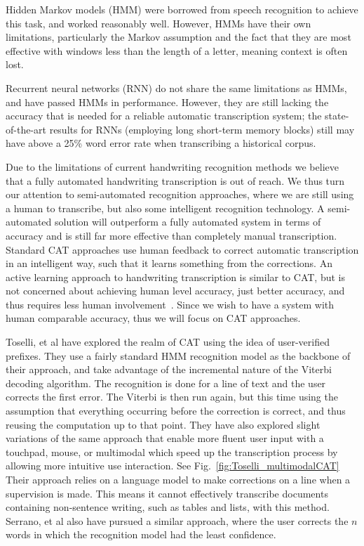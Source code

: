 \documentclass[ms]{byuprop}
\begin{document}
Hidden Markov models (HMM) were borrowed from speech recognition to achieve this task, and worked reasonably well\cite{Marti2001}. However, HMMs have their own limitations, particularly the Markov assumption and the fact that they are most effective with windows less than the length of a letter, meaning context is often lost.

Recurrent neural networks (RNN) do not share the same limitations as HMMs, and have passed HMMs in performance\cite{Graves2009hmm}. However, they are still lacking the accuracy that is needed for a reliable automatic transcription system; the state-of-the-art results for RNNs (employing long short-term memory blocks) still may have above a 25\% word error rate when transcribing a historical corpus\cite{icdarComp2015}.



Due to the limitations of current handwriting recognition methods we believe that a fully automated handwriting transcription is out of reach. We thus turn our attention to semi-automated recognition approaches, where we are still using a human to transcribe, but also some intelligent recognition technology. A semi-automated solution will outperform a fully automated system in terms of accuracy and is still far more effective than completely manual transcription. Standard CAT approaches use human feedback to correct automatic transcription in an intelligent way, such that it learns something from the corrections. An active learning approach to handwriting transcription is similar to CAT, but is not concerned about achieving human level accuracy, just better accuracy, and thus requires less human involvement~\cite{Serrano2010}. Since we wish to have a system with human comparable accuracy, thus we will focus on CAT approaches.

Toselli, et al\cite{Toselli2007} have explored the realm of CAT using the idea of user-verified prefixes. They use a fairly standard HMM recognition model as the backbone of their approach, and take advantage of the incremental nature of the Viterbi decoding algorithm. The recognition is done for a line of text and the user corrects the first error. The Viterbi is then run again, but this time using the assumption that everything occurring before the correction is correct, and thus reusing the computation up to that point. They have also explored slight variations of the same approach that enable more fluent user input with a touchpad\cite{Toselli2008}, mouse\cite{Toselli2009}, or multimodal\cite{Toselli2010} which speed up the transcription process by allowing more intuitive use interaction. See Fig.~\ref{fig:Toselli_multimodalCAT} Their approach relies on a language model to make corrections on a line when a supervision is made. This means it cannot effectively transcribe documents containing non-sentence writing, such as tables and lists, with this method. Serrano, et al also have pursued a similar approach, where the user corrects the $n$ words in which the recognition model had the least confidence\cite{Serrano2014}.
\end{document}
